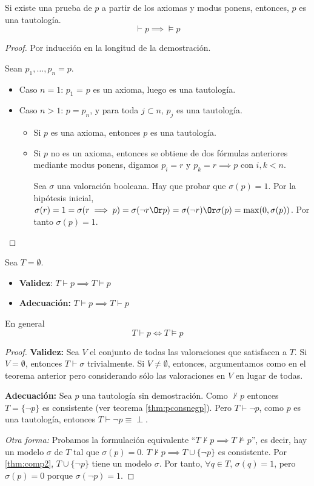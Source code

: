 \begin{theorem}
	Si existe una prueba de $p$ a partir de los axiomas y modus ponens, entonces, $p$ es una tautología.
	$$\vdash p \implies \vDash p$$
\end{theorem}
\begin{proof}
	Por inducción en la longitud de la demostración.

	Sean $p_1,\hdots, p_n=p$.
	\begin{itemize}
		\item Caso $n=1$: $p_1$ = $p$ es un axioma, luego es una tautología.
		\item Caso $n>1$: $p=p_n$, y para toda $j\subset n$, $p_j$ es una tautología.
		\begin{itemize}
			\item Si $p$ es una axioma, entonces $p$ es una tautología.
			\item Si $p$ no es un axioma, entonces se obtiene de dos fórmulas anteriores mediante modus ponens, digamos $p_i = r$ y $p_k=r\implies p$ con $i,k<n$.

			Sea $\sigma$ una valoración booleana. Hay que probar que $\sigma(p) = 1$. Por la hipótesis inicial, $\sigma(r) = 1 = \sigma(r\implies p) = \sigma(\neg r \Or p) = \sigma(\neg r) \Or \sigma(p) = \max(0,\sigma(p))$.
			Por tanto $\sigma(p) = 1$.
		\end{itemize}
	\end{itemize}
\end{proof}

\begin{theorem}	Sea $T = \emptyset$.
	\begin{itemize}
		\item \textbf{Validez}:
		$T \vdash p \implies T \vDash p$
		\item \textbf{Adecuación:}
		$T \vDash p \implies T \vdash p$
	\end{itemize}
	En general $$T\vdash p \iff T\vDash p$$
\end{theorem}
\begin{proof}

	\textbf{Validez:} Sea $V$ el conjunto de todas las valoraciones que satisfacen a $T$. Si $V=\emptyset$, entonces $T\vdash \sigma$ trivialmente. Si $V\neq \emptyset$, entonces, argumentamos como en el teorema anterior pero considerando sólo las valoraciones en $V$ en lugar de todas.

	\textbf{Adecuación:} Sea $p$ una tautología sin demostración. Como $\nvdash p$ entonces $T=\{\neg p\}$ es consistente (ver teorema \ref{thm:pconsnegp}). Pero $T\vdash \neg p$, como $p$ es una tautología, entonces $T\vdash \neg p\equiv \perp$.
	
	\textit{Otra forma:} Probamos la formulación equivalente ``$T\nvdash p \implies T\nvDash p$'', es decir, hay un modelo $\sigma$ de $T$ tal que $\sigma(p) = 0$. $T\nvdash p \implies T\cup\{\neg p\}$ es consistente. Por \ref{thm:comp2}, $T\cup\{\neg p\}$ tiene un modelo $\sigma$. Por tanto, $\forall q\in T$, $\sigma(q) = 1$, pero $\sigma(p) = 0$ porque $\sigma(\neg p) = 1$.

\end{proof}

